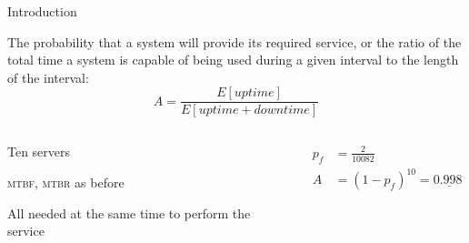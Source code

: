 \begin{frame}{Introduction}
	
\begin{definition}[Availability]
The probability that a system will provide its required service, or the ratio
of the total time a system is capable of being used during a given interval to
the length of the interval:
\[
  A = \frac{E[\mathit{uptime}]}{E[\mathit{uptime} + \mathit{downtime}] }
\]
\end{definition}

\begin{example}
\begin{columns}[t]
\begin{column}{0.55\textwidth}
\BI
\item Ten servers
\item \textsc{mtbf}, \textsc{mtbr} as before
\item All needed at the same time to perform the service
\EI
\end{column}
\begin{column}{0.45\textwidth}
\pause
\begin{align*}
  p_f &= \frac{2}{10082}\\
  A &= (1-p_f)^{10} = 0.\underline{99}8
\end{align*}
\end{column}
\end{columns}
\end{example}


\end{frame}


